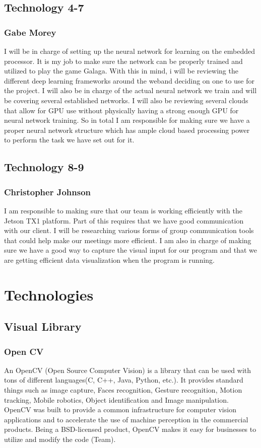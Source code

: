 \documentclass{scrreprt}
\begin{document}
\section{Technology 4-7}
\subsection{Gabe Morey}
I will be in charge of setting up the neural network for learning on the embedded processor. 
It is my job to make sure the network can be properly trained and utilized to play the game Galaga.
With this in mind, i will be reviewing the different deep learning frameworks around the weband deciding on one to use for the project. 
I will also be in charge of the actual neural network we train and will be covering several established networks. 
I will also be reviewing several clouds that allow for GPU use without physically having a strong enough GPU for neural network training. So in total I am responsible for making sure we have a proper neural network structure which has ample cloud based processing power to perform the task we have set out for it.

\section{Technology 8-9}
\subsection{Christopher Johnson}
I am responsible to making sure that our team is working efficiently with the Jetson TX1 platform.
Part of this requires that we have good communication with our client.
I will be researching various forms of group communication tools that could help make our meetings more efficient.
I am also in charge of making sure we have a good way to capture the visual input for our program and that we are getting efficient data visualization when the program is running.

\chapter{Technologies}
\section{Visual Library}
\subsection{Open CV}
An OpenCV (Open Source Computer Vision) is a library that can be used with tons of different languages(C, C++, Java, Python, etc.).
 It provides standard things such as image capture, Faces recognition, Gesture recognition, Motion tracking, Mobile robotics, Object identification and Image manipulation.
 OpenCV was built to provide a common infrastructure for computer vision applications and to accelerate the use of machine perception in the commercial products.
 Being a BSD-licensed product, OpenCV makes it easy for businesses to utilize and modify the code (Team).
\end{document}
